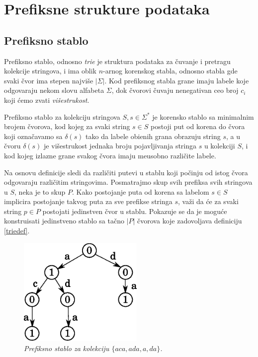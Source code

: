 \section{Prefiksne strukture podataka}

\subsection{Prefiksno stablo}

Prefiksno stablo, odnosno \textit{trie} je struktura podataka za \v cuvanje i pretragu kolekcije stringova, i ima oblik $n$-arnog korenskog stabla, odnosno stabla gde svaki \v cvor ima stepen najvi\v se $|\Sigma|$. Kod prefiksnog stabla grane imaju labele koje odgovaraju nekom slovu alfabeta $\Sigma$, dok \v cvorovi \v cuvaju nenegativan ceo broj $c_i$ koji \' cemo zvati \textit{vi\v sestrukost}.

\begin{dfn}
\label{triedef}
Prefiksno stablo za kolekciju stringova $S, s \in \Sigma^*$ je korensko stablo sa minimalnim brojem \v cvorova, kod kojeg za svaki string $s \in S$ postoji put od korena do \v cvora koji ozna\v cavamo sa $\delta(s)$ tako da labele obi\dj enih grana obrazuju string $s$, a u \v cvoru $\delta(s)$ je vi\v sestrukost jednaka broju pojavljivanja stringa $s$ u kolekciji $S$, i kod kojeg izlazne grane svakog \v cvora imaju me\dj usobno razli\v cite labele.
\end{dfn}

Na osnovu definicije sledi da razli\v citi putevi u stablu koji po\v cinju od istog \v cvora odgovaraju razli\v citim stringovima. Posmatrajmo skup svih prefiksa svih stringova u $S$, neka je to skup $P$. Kako postojanje puta od korena sa labelom $s \in S$ implicira postojanje takvog puta za sve prefikse stringa $s$, va\v zi da \' ce za svaki string $p \in P$ postojati jedinstven \v cvor u stablu. Pokazuje se da je mogu\' ce konstruisati jedinstveno stablo sa ta\v cno $|P|$ \v cvorova koje zadovoljava definiciju \ref{triedef}.

\begin{figure}[H]
    \centering
    \includegraphics[width=60mm]{../img/trie1.eps}
    \caption*{\textit{Prefiksno stablo za kolekciju $\{aca,ada,a,da\}$.}}
\end{figure}

